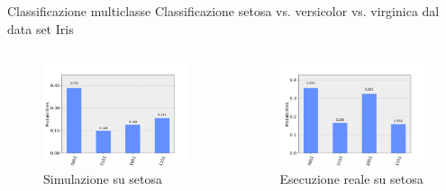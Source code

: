 \documentclass{beamer}
\begin{document}
    \begin{frame}{Classificazione multiclasse}
        Classificazione setosa vs. versicolor vs. virginica dal data set Iris
        \begin{columns}
            \begin{figure}[h]
                \centering
                \includegraphics[width=\textwidth]{gfx/setosa_simulato_multiclasse.png}
                \caption{Simulazione su setosa}
                \label{fig:simulazione.multi.setosa}
            \end{figure}
            \begin{figure}[h]
                \centering
                \includegraphics[width=\textwidth]{gfx/setosa_reale_20190913:1716.png}
                \caption{Esecuzione reale su setosa}
                \label{fig:esecuzione.multi.setosa}
            \end{figure}
        \end{columns}
    \end{frame}
\end{document}
